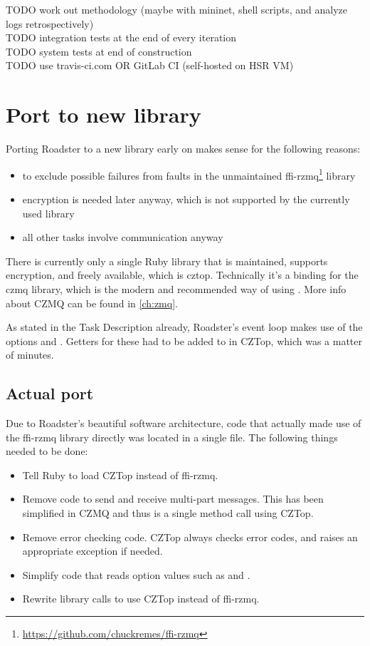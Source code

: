 TODO work out methodology (maybe with mininet, shell scripts, and analyze logs retrospectively)\\
TODO integration tests at the end of every iteration\\
TODO system tests at end of construction\\
TODO use travis-ci.com OR GitLab CI (self-hosted on HSR VM)\\

\section{Port to new \zmq library}\label{sec:approach:port}
Porting Roadster to a new \zmq library early on makes sense for the following reasons:

\begin{itemize}
\item to exclude possible failures from faults in the unmaintained ffi-rzmq\footnote{\url{https://github.com/chuckremes/ffi-rzmq}} library
\item encryption is needed later anyway, which is not supported by the currently used library
\item all other tasks involve \zmq communication anyway
\end{itemize}

There is currently only a single Ruby library that is maintained, supports
encryption, and freely available, which is \gls{cztop}. Technically it's a
binding for the \gls{czmq} library, which is the modern and recommended way of
using \zmq. More info about CZMQ can be found in \autoref{ch:zmq}.

As stated in the Task Description already, Roadster's event loop makes use of
the \zmq options  and . Getters for these had to be
added to in CZTop, which was a matter of minutes.

\subsection{Actual port}
Due to Roadster's beautiful software architecture, code that actually made use
of the ffi-rzmq library directly was located in a single file. The following
things needed to be done:

\begin{itemize}
\item Tell Ruby to load CZTop instead of ffi-rzmq.
\item Remove code to send and receive multi-part messages. This has been simplified
in CZMQ and thus is a single method call using CZTop.
\item Remove error checking code. CZTop always checks error codes, and raises
an appropriate exception if needed.
\item Simplify code that reads option values such as  and .
\item Rewrite library calls to use CZTop instead of ffi-rzmq.
\end{itemize}

